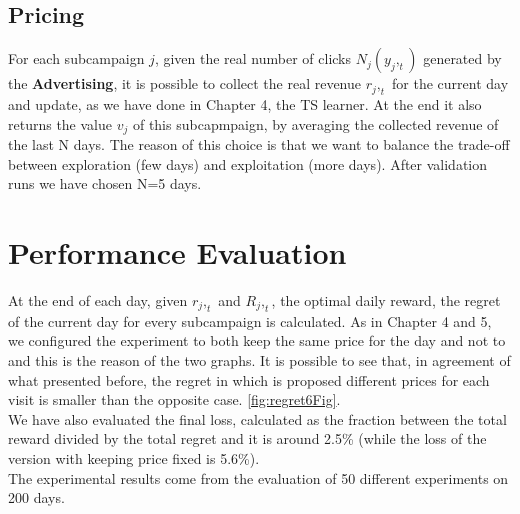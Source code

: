     \subsection{Pricing}
    For each subcampaign $ j $, given the real number of clicks $ N_j(y_j,_t) $ generated by the \textbf{Advertising}, it is possible to collect the real revenue $ r_j,_t $ for the current day and update, as we have done in Chapter 4, the TS learner. At the end it also returns the value $ v_j $ of this subcapmpaign, by averaging the collected revenue of the last N days. The reason of this choice is that we want to balance the trade-off between exploration (few days) and exploitation (more days). After validation runs we have chosen N=5 days.

\section{Performance Evaluation}
At the end of each day, given $ r_j,_t $ and $ R_j,_t $, the optimal daily reward, the regret of the current day for every subcampaign is calculated. As in Chapter 4 and 5, we configured the experiment to both keep the same price for the day and not to and this is the reason of the two graphs. It is possible to see that, in agreement of what presented before, the regret in which is proposed different prices for each visit is smaller than the opposite case. \ref{fig:regret6Fig}.\\ 
We have also evaluated the final loss, calculated as the fraction between the total reward divided by the total regret and it is around 2.5\% (while the loss of the version with keeping price fixed is 5.6\%). \\
The experimental results come from the evaluation of 50 different experiments on 200 days.


